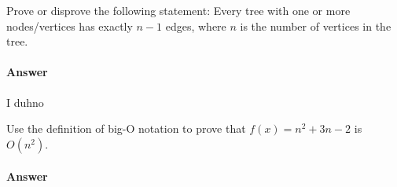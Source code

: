 \documentclass{article}
\begin{document}
\collab{\todo{}}

Prove or disprove the following statement: Every tree with one or more
nodes/vertices has exactly $n-1$ edges, where $n$ is the number of vertices in
the tree.

\paragraph{Answer}

I duhno
\todo{}


\collab{\todo{}}
Use the definition of big-O notation to prove that $f(x)=n^2 + 3n -2$ is
$O(n^2)$.

\paragraph{Answer}

\todo{}
\end{document}
